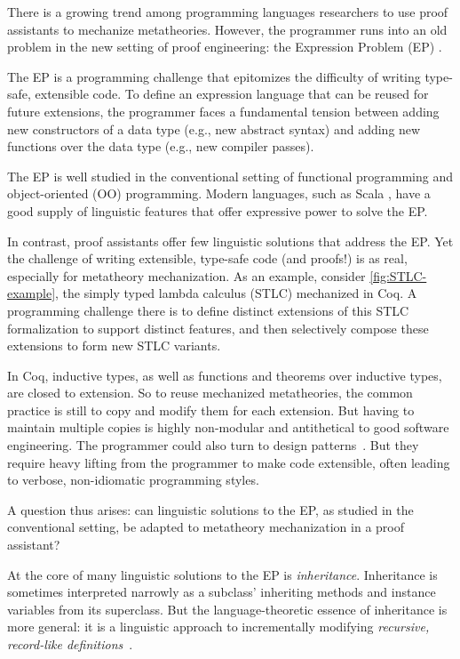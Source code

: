 
There is a growing trend among programming languages researchers
to use proof assistants to mechanize meta\-theories.
%
However, the programmer runs into an old problem
in the new setting of proof engineering:
the Expression Problem (EP) \cite{wadler-ep}.

The EP is a programming challenge that
epitomizes the difficulty of writing type-safe, extensible code.
To define an expression language that can be reused for future extensions,
the programmer faces a fundamental tension \cite{reynolds1975} between
adding new constructors of a data type (e.g., new abstract syntax) and
adding new functions over the data type (e.g., new compiler passes).

The EP is well studied in the conventional setting of functional
programming and object-oriented (OO) programming.
Modern languages, such as Scala \cite{scala-oopsla05}, have a good
supply of linguistic features that offer expressive power to solve the
EP.

In contrast, proof assistants offer few linguistic solutions that
address the EP.
Yet the challenge of writing extensible, type-safe code (and proofs!) is
as real, especially for metatheory mechanization.
As an example, consider \cref{fig:STLC-example}, the simply typed
lambda calculus (STLC) mechanized in Coq.
A programming challenge there is to define distinct extensions of this
STLC formalization to support distinct features,
and then selectively compose these extensions to form new STLC variants.

In Coq, inductive types, as well as functions and theorems over
inductive types, are closed to extension.
So to reuse mechanized metatheories,
the common practice is still to copy and modify them for each extension.
But having to maintain multiple copies is highly non-modular and
antithetical to good software engineering.
%
The programmer could also turn to design patterns~\cite{delaware2011,delaware2013}.
But they require heavy lifting from the programmer to make code
extensible, often leading to verbose, non-idiomatic programming styles.

A question thus arises: can linguistic solutions to the EP, as studied
in the conventional setting, be adapted to metatheory mechanization in
a proof assistant?

At the core of many linguistic solutions to the EP is \emph{inheritance}.
Inheritance is sometimes interpreted narrowly as a subclass'
inheriting methods and instance variables from its superclass.
But the language-theoretic essence of inheritance is more general:
it is a linguistic approach to incrementally modifying
\emph{recursive, record-like definitions}~\cite{cook1990inheritance}.

